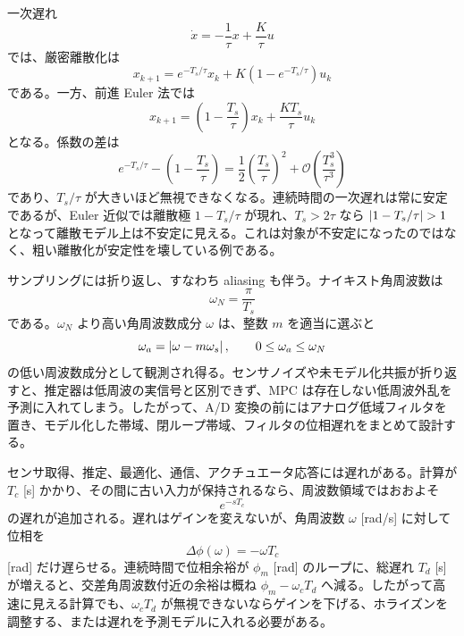 一次遅れ
\begin{equation}
  \dot{x}=-\frac{1}{\tau}x+\frac{K}{\tau}u
\end{equation}
では、厳密離散化は
\begin{equation}
  x_{k+1}=e^{-T_s/\tau}x_k+K(1-e^{-T_s/\tau})u_k
\end{equation}
である。一方、前進 Euler 法では
\begin{equation}
  x_{k+1}=\left(1-\frac{T_s}{\tau}\right)x_k+\frac{KT_s}{\tau}u_k
\end{equation}
となる。係数の差は
\begin{equation}
  e^{-T_s/\tau}-\left(1-\frac{T_s}{\tau}\right)
  =\frac{1}{2}\left(\frac{T_s}{\tau}\right)^2+\mathcal{O}\left(\frac{T_s^3}{\tau^3}\right)
\end{equation}
であり、$T_s/\tau$ が大きいほど無視できなくなる。連続時間の一次遅れは常に安定であるが、Euler 近似では離散極 $1-T_s/\tau$ が現れ、$T_s>2\tau$ なら $\abs{1-T_s/\tau}>1$ となって離散モデル上は不安定に見える。これは対象が不安定になったのではなく、粗い離散化が安定性を壊している例である。

サンプリングには折り返し、すなわち aliasing も伴う。ナイキスト角周波数は
\begin{equation}
  \omega_N=\frac{\pi}{T_s}
\end{equation}
である。$\omega_N$ より高い角周波数成分 $\omega$ は、整数 $m$ を適当に選ぶと
\begin{equation}
  \omega_a=\left|\omega-m\omega_s\right|,
  \qquad
  0\le\omega_a\le\omega_N
\end{equation}
の低い周波数成分として観測され得る。センサノイズや未モデル化共振が折り返すと、推定器は低周波の実信号と区別できず、MPC は存在しない低周波外乱を予測に入れてしまう。したがって、A/D 変換の前にはアナログ低域フィルタを置き、モデル化した帯域、閉ループ帯域、フィルタの位相遅れをまとめて設計する。

センサ取得、推定、最適化、通信、アクチュエータ応答には遅れがある。計算が $T_c$ [s] かかり、その間に古い入力が保持されるなら、周波数領域ではおおよそ
\begin{equation}
  e^{-sT_c}
\end{equation}
の遅れが追加される。遅れはゲインを変えないが、角周波数 $\omega$ [rad/s] に対して位相を
\begin{equation}
  \Delta\phi(\omega)=-\omega T_c
\end{equation}
[rad] だけ遅らせる。連続時間で位相余裕が $\phi_m$ [rad] のループに、総遅れ $T_d$ [s] が増えると、交差角周波数付近の余裕は概ね $\phi_m-\omega_cT_d$ へ減る。したがって高速に見える計算でも、$\omega_cT_d$ が無視できないならゲインを下げる、ホライズンを調整する、または遅れを予測モデルに入れる必要がある。

